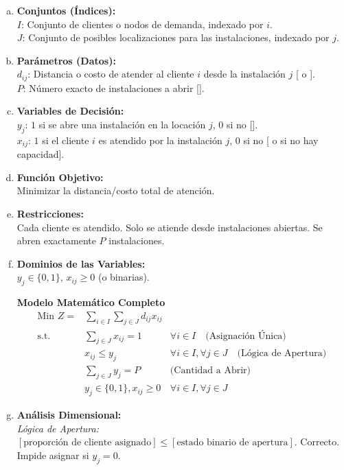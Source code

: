 \documentclass{article}
\begin{document}
	\begin{enumerate}[a)]
		\item \textbf{Conjuntos (Índices):}\\
		$I$: Conjunto de clientes o nodos de demanda, indexado por $i$.\\
		$J$: Conjunto de posibles localizaciones para las instalaciones, indexado por $j$.
		
		\item \textbf{Parámetros (Datos):}\\
		$d_{ij}$: Distancia o costo de atender al cliente $i$ desde la instalación $j$ [ o \text{\$}].\\
		$P$: Número exacto de instalaciones a abrir [].
		
		\item \textbf{Variables de Decisión:}\\
		$y_j$: $1$ si se abre una instalación en la locación $j$, $0$ si no [].\\
		$x_{ij}$: $1$ si el cliente $i$ es atendido por la instalación $j$, $0$ si no [ o  si no hay capacidad].
		
		\item \textbf{Función Objetivo:}\\
		Minimizar la distancia/costo total de atención.
		
		\item \textbf{Restricciones:}\\
		Cada cliente es atendido. Solo se atiende desde instalaciones abiertas. Se abren exactamente $P$ instalaciones.
		
		\item \textbf{Dominios de las Variables:}\\
		$y_j \in \{0, 1\}$, $x_{ij} \geq 0$ (o binarias).
		
		\vspace{0.5cm}
		\begin{center}
			\textbf{Modelo Matemático Completo}
			$$\begin{aligned}
				\text{Min } Z = & \sum_{i \in I} \sum_{j \in J} d_{ij} x_{ij} \\
				\text{s.t.} \quad & \sum_{j \in J} x_{ij} = 1 & \forall i \in I \quad \text{(Asignación Única)} \\
				& x_{ij} \leq y_j & \forall i \in I, \forall j \in J \quad \text{(Lógica de Apertura)} \\
				& \sum_{j \in J} y_j = P & \text{(Cantidad a Abrir)} \\
				& y_j \in \{0, 1\}, x_{ij} \geq 0 & \forall i \in I, \forall j \in J
			\end{aligned}$$
		\end{center}
		\vspace{0.5cm}
		
		\item \textbf{Análisis Dimensional:}\\
		\textit{Lógica de Apertura:} $[\text{proporción de cliente asignado}] \leq [\text{estado binario de apertura}]$. Correcto. Impide asignar si $y_j = 0$.
	\end{enumerate}
	
\end{document}
